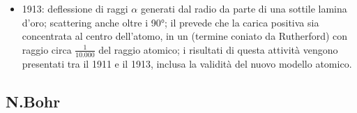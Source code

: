 \documentclass[letterpaper,10pt,italian]{jupyterBook}
\begin{document}
\begin{itemize}
\begin{itemize}
\item {} 
\sphinxhyphen{}1913: deflessione di raggi \(\alpha\) generati dal radio da parte di una sottile lamina d’oro; scattering anche oltre i 90°; il  prevede che la carica positiva sia concentrata al centro dell’atomo, in un  (termine coniato da Rutherford) con raggio circa \(\frac{1}{10.000}\) del raggio atomico; i risultati di questa attività vengono presentati tra il 1911 e il 1913, inclusa la validità del nuovo modello atomico.

\end{itemize}

\end{itemize}


\subsection{N.Bohr}
\end{document}
